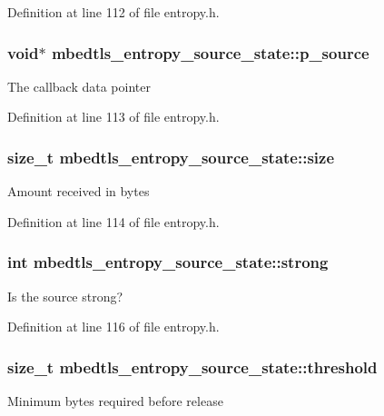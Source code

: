 Definition at line 112 of file entropy.\-h.

\hypertarget{structmbedtls__entropy__source__state_ac290f929e3382e26443b6625ab9a0d78}{
\subsubsection[{p\-\_\-source}]{\setlength{\rightskip}{0pt plus 5cm}void$\ast$ mbedtls\-\_\-entropy\-\_\-source\-\_\-state\-::p\-\_\-source}}\label{structmbedtls__entropy__source__state_ac290f929e3382e26443b6625ab9a0d78}
The callback data pointer 

Definition at line 113 of file entropy.\-h.

\hypertarget{structmbedtls__entropy__source__state_a395d9641c3aa0cddd5b1977c9e2a6aba}{
\subsubsection[{size}]{\setlength{\rightskip}{0pt plus 5cm}size\-\_\-t mbedtls\-\_\-entropy\-\_\-source\-\_\-state\-::size}}\label{structmbedtls__entropy__source__state_a395d9641c3aa0cddd5b1977c9e2a6aba}
Amount received in bytes 

Definition at line 114 of file entropy.\-h.

\hypertarget{structmbedtls__entropy__source__state_a13f749f23a93d986357832477335ec83}{
\subsubsection[{strong}]{\setlength{\rightskip}{0pt plus 5cm}int mbedtls\-\_\-entropy\-\_\-source\-\_\-state\-::strong}}\label{structmbedtls__entropy__source__state_a13f749f23a93d986357832477335ec83}
Is the source strong? 

Definition at line 116 of file entropy.\-h.

\hypertarget{structmbedtls__entropy__source__state_ab5ac92f3c7acd5a47ee986fb915e9686}{
\subsubsection[{threshold}]{\setlength{\rightskip}{0pt plus 5cm}size\-\_\-t mbedtls\-\_\-entropy\-\_\-source\-\_\-state\-::threshold}}\label{structmbedtls__entropy__source__state_ab5ac92f3c7acd5a47ee986fb915e9686}
Minimum bytes required before release 

